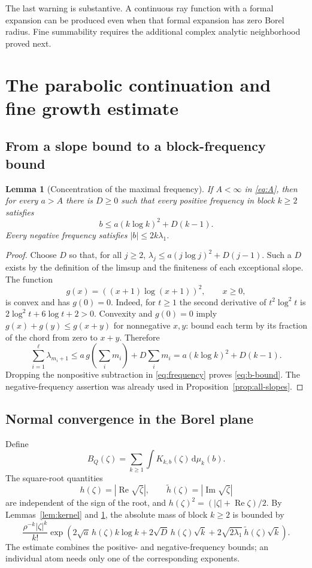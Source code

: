 \documentclass[11pt,a4paper]{article}
\numberwithin{equation}{section}
\newtheorem{lemma}[theorem]{Lemma}
\theoremstyle{definition}
\theoremstyle{remark}
\newcommand{\dd}{\mathrm d}
\newcommand{\Ree}{\operatorname{Re}}
\newcommand{\Imm}{\operatorname{Im}}
\begin{document}
The last warning is substantive.  A continuous ray function with a
formal expansion can be produced even when that formal expansion has
zero Borel radius.  Fine summability requires the additional complex
analytic neighborhood proved next.

\section{The parabolic continuation and fine growth estimate}
\label{sec:continuation}

\subsection{From a slope bound to a block-frequency bound}
\begin{lemma}[Concentration of the maximal frequency]
\label{lem:frequency}
If $A<\infty$ in \eqref{eq:A}, then for every $a>A$ there is $D\ge0$
such that every positive frequency in block $k\ge2$ satisfies
\begin{equation}
 b\le a(k\log k)^2+D(k-1).
 \label{eq:b-bound}
\end{equation}
Every negative frequency satisfies $|b|\le2k\lambda_1$.
\end{lemma}
\begin{proof}
Choose $D$ so that, for all $j\ge2$,
$\lambda_j\le a(j\log j)^2+D(j-1)$.  Such a $D$ exists by the definition
of the limsup and the finiteness of each exceptional slope.  The function
\[
 g(x)=((x+1)\log(x+1))^2,\qquad x\ge0,
\]
is convex and has $g(0)=0$.  Indeed, for $t\ge1$ the second derivative of
$t^2\log^2t$ is $2\log^2t+6\log t+2>0$.  Convexity and $g(0)=0$ imply
$g(x)+g(y)\le g(x+y)$ for nonnegative $x,y$: bound each term by its
fraction of the chord from zero to $x+y$.  Therefore
\[
 \sum_{i=1}^\ell\lambda_{m_i+1}
 \le a\,g\!\left(\sum_i m_i\right)+D\sum_i m_i
 =a(k\log k)^2+D(k-1).
\]
Dropping the nonpositive subtraction in \eqref{eq:frequency} proves
\eqref{eq:b-bound}.  The negative-frequency assertion was already used
in Proposition~\ref{prop:all-slopes}.
\end{proof}

\subsection{Normal convergence in the Borel plane}
Define
\begin{equation}
 B_Q(\zeta)=\sum_{k\ge1}\int K_{k,b}(\zeta)\,\dd\mu_k(b).
 \label{eq:BQ}
\end{equation}
The square-root quantities
\[
 h(\zeta)=|\Ree\sqrt\zeta|,
 \qquad \widetilde h(\zeta)=|\Imm\sqrt\zeta|
\]
are independent of the sign of the root, and
$h(\zeta)^2=(|\zeta|+\Ree\zeta)/2$.
By Lemmas~\ref{lem:kernel} and \ref{lem:frequency}, the absolute mass of
block $k\ge2$ is bounded by
\begin{equation}
 \frac{\rho^{-k}|\zeta|^k}{k!}
 \exp\!\left(2\sqrt a\,h(\zeta)k\log k
       +2\sqrt D\,h(\zeta)\sqrt k
       +2\sqrt{2\lambda_1}\,\widetilde h(\zeta)\sqrt k\right).
 \label{eq:master-bound}
\end{equation}
The estimate combines the positive- and negative-frequency bounds; an
individual atom needs only one of the corresponding exponents.
\end{document}
